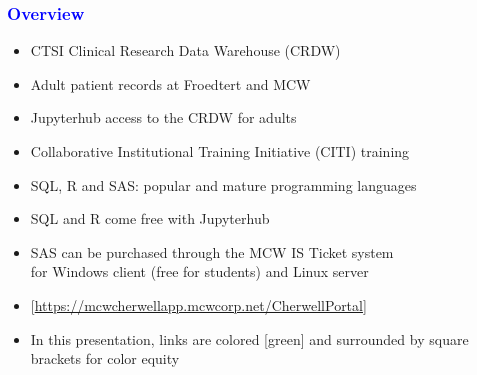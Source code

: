 \documentclass[11pt,pdftex,dvipsnames,usenames]{beamer}
\begin{document}
\begin{frame}[fragile]\frametitle{\bf\textcolor{blue}{Overview}}

\begin{itemize}
\item CTSI Clinical Research Data Warehouse (CRDW)
\item Adult patient records at Froedtert and MCW
\item Jupyterhub access to the CRDW for adults
\item Collaborative Institutional Training Initiative (CITI) training
\item SQL, R and SAS: popular and mature programming languages
\item SQL and R come free with Jupyterhub
\item SAS can be purchased through the MCW IS Ticket system\\
 for Windows client (free for students) and Linux server 
\item \textcolor{PineGreen}{[\href{https://mcwcherwellapp.mcwcorp.net/CherwellPortal}{https://mcwcherwellapp.mcwcorp.net/CherwellPortal}]}
\item In this presentation, links are colored \textcolor{PineGreen}{[green]}
and surrounded by square brackets for color equity

\end{itemize}

\end{frame}
\end{document}
